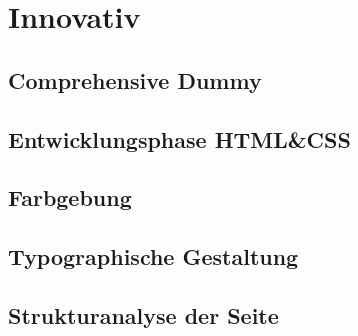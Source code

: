 \section{Innovativ}

	\subsection{Comprehensive Dummy}

	\subsection{Entwicklungsphase HTML&CSS}

	\subsection{Farbgebung}

	\subsection{Typographische Gestaltung}

	\subsection{Strukturanalyse der Seite}